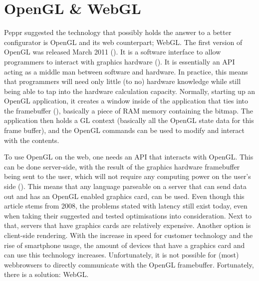 \clearpage
\section{OpenGL \& WebGL}
Peppr suggested the technology that possibly holds the answer to a better configurator is OpenGL and its web counterpart; WebGL.
The first version of OpenGL was released March 2011 (\cite{openGLsite}). It is a software interface to allow programmers to interact with graphics hardware (\cite{openGLSpecification}). It is essentially an API acting as a middle man between software and hardware. In practice, this means that programmers will need only little (to no) hardware knowledge while still being able to tap into the hardware calculation capacity. Normally, starting up an OpenGL application, it creates a window inside of the application that ties into the framebuffer (\cite{framebuffer}), basically a piece of RAM memory containing the bitmap. The application then holds a GL context (basically all the OpenGL state data for this frame buffer), and the OpenGL commands can be used to modify and interact with the contents.

To use OpenGL on the web, one needs an API that interacts with OpenGL. This can be done server-side, with the result of the graphics hardware framebuffer being sent to the user, which will not require any computing power on the user's side (\cite{CRRS}). This means that any language parseable on a server that can send data out and has an OpenGL enabled graphics card, can be used. Even though this article stems from 2008, the problems stated with latency still exist today, even when taking their suggested and tested optimisations into consideration. Next to that, servers that have graphics cards are relatively expensive. Another option is client-side rendering. With the increase in speed for customer technology and the rise of smartphone usage, the amount of devices that have a graphics card and can use this technology increases. Unfortunately, it is not possible for (most) webbrowsers to directly communicate with the OpenGL framebuffer. Fortunately, there is a solution: WebGL.

\cite{webGL}

